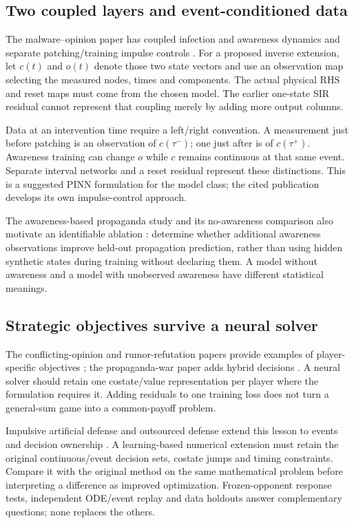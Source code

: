 \documentclass[11pt,a4paper]{article}
\theoremstyle{definition}
\theoremstyle{remark}
\begin{document}
\subsection{Two coupled layers and event-conditioned data}
The malware--opinion paper has coupled infection and awareness dynamics and separate patching/training impulse controls \cite{malware2025}. For a proposed inverse extension, let $c(t)$ and $o(t)$ denote those two state vectors and use an observation map selecting the measured nodes, times and components. The actual physical RHS and reset maps must come from the chosen model. The earlier one-state SIR residual cannot represent that coupling merely by adding more output columns.

Data at an intervention time require a left/right convention. A measurement just before patching is an observation of $c(\tau^-)$; one just after is of $c(\tau^+)$. Awareness training can change $o$ while $c$ remains continuous at that same event. Separate interval networks and a reset residual represent these distinctions. This is a suggested PINN formulation for the model class; the cited publication develops its own impulse-control approach.

The awareness-based propaganda study and its no-awareness comparison also motivate an identifiable ablation \cite{awareness2025}: determine whether additional awareness observations improve held-out propagation prediction, rather than using hidden synthetic states during training without declaring them. A model without awareness and a model with unobserved awareness have different statistical meanings.

\subsection{Strategic objectives survive a neural solver}
The conflicting-opinion and rumor-refutation papers provide examples of player-specific objectives \cite{opinions2020,rumor2021}; the propaganda-war paper adds hybrid decisions \cite{war2024}. A neural solver should retain one costate/value representation per player where the formulation requires it. Adding residuals to one training loss does not turn a general-sum game into a common-payoff problem.

Impulsive artificial defense and outsourced defense extend this lesson to events and decision ownership \cite{impulse2023,outsource2024}. A learning-based numerical extension must retain the original continuous/event decision sets, costate jumps and timing constraints. Compare it with the original method on the same mathematical problem before interpreting a difference as improved optimization. Frozen-opponent response tests, independent ODE/event replay and data holdouts answer complementary questions; none replaces the others.
\end{document}
